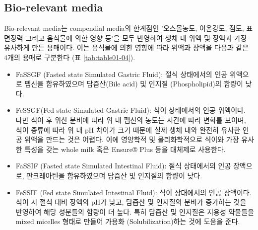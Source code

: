 \documentclass[
  11pt,
  krantz2, a4paper, twoside]{krantz}
\providecommand{\tightlist}{%
  \setlength{\itemsep}{0pt}\setlength{\parskip}{0pt}}
\begin{document}
\subsection{Bio-relevant media}\label{bio-relevant-media}

Bio-relevant media는 compendial media의 한계점인 '오스몰농도, 이온강도,
점도, 표면장력 그리고 음식물에 의한 영향 등'을 모두 반영하여 생체 내
위액 및 장액과 가장 유사하게 만든 용매이다. 이는 음식물에 의한 영향에
따라 위액과 장액을 다음과 같은 4개의 용매로 구분한다 (표 \ref{tab:table01-04}).

\begin{itemize}
\tightlist
\item
  FaSSGF (Fasted state Simulated Gastric Fluid): 절식 상태에서의 인공
  위액으로 펩신을 함유하였으며 담즙산(Bile acid) 및 인지질
  (Phospholipid)의 함량이 낮다.
\item
  FeSSGF(Fed state Simulated Gastric Fluid): 식이 상태에서의 인공
  위액이다. 다만 식이 후 위산 분비에 따라 위 내 펩신의 농도는 시간에
  따라 변화를 보이며, 식이 종류에 따라 위 내 pH 차이가 크기 때문에
  실제 생체 내와 완전히 유사한 인공 위액을 만드는 것은 어렵다. 이에
  영양학적 및 물리화학적으로 식이와 가장 유사한 특성을 갖는 whole milk
  혹은 Ensure® Plus 등을 대체제로 사용한다.
\item
  FaSSIF (Fasted state Simulated Intestinal Fluid): 절식 상태에서의
  인공 장액으로, 판크레아틴을 함유하였으며 담즙산 및 인지질의 함량이
  낮다.
\item
  FeSSIF (Fed state Simulated Intestinal Fluid): 식이 상태에서의 인공
  장액이다. 식이 시 절식 대비 장액의 pH가 낮고, 담즙산 및 인지질의
  분비가 증가하는 것을 반영하여 해당 성분들의 함량이 더 높다. 특히
  담즙산 및 인지질은 지용성 약물들을 mixed micelles 형태로 만들어
  가용화 (Solubilization)하는 것에 도움을 준다.
\end{itemize}
\end{document}
